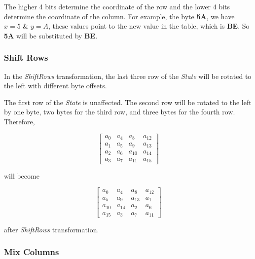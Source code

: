 \documentclass[a4paper, 10pt]{article}
\begin{document}
\begin{multicols}{2}
            The higher 4 bits determine the coordinate of the row and the lower 4 bits determine the coordinate of the column. For example, the byte \textbf{5A}, we have $x=5$ \& $y=A$, these values point to the new value in the table, which is \textbf{BE}. So \textbf{5A} will be substituted by \textbf{BE}.

            \subsubsection{Shift Rows}
            \label{sec:shift-rows-intro}

            In the \textit{ShiftRows} transformation, the last three row of the \textit{State} will be rotated to the left with different byte offsets.

            The first row of the \textit{State} is unaffected. The second row will be rotated to the left by one byte, two bytes for the third row, and three bytes for the fourth row. Therefore,

            \begin{equation}
                \begin{bmatrix}
                    a_{0} & a_{4} & a_{8} & a_{12}\\
                    a_{1} & a_{5} & a_{9} & a_{13}\\
                    a_{2} & a_{6} & a_{10} & a_{14}\\
                    a_{3} & a_{7} & a_{11} & a_{15}
                \end{bmatrix}
                \label{equ:shift-rows-example}
            \end{equation}

            will become

            \begin{equation}
                \begin{bmatrix}
                    a_{0} & a_{4} & a_{8} & a_{12}\\
                    a_{5} & a_{9} & a_{13} & a_{1}\\
                    a_{10} & a_{14} & a_{2} & a_{6}\\
                    a_{15} & a_{3} & a_{7} & a_{11}
                \end{bmatrix}
            \end{equation}

            after \textit{ShiftRows} transformation.

            \subsubsection{Mix Columns}
            \label{sec:mixcolumns}


\end{multicols}
\end{document}
